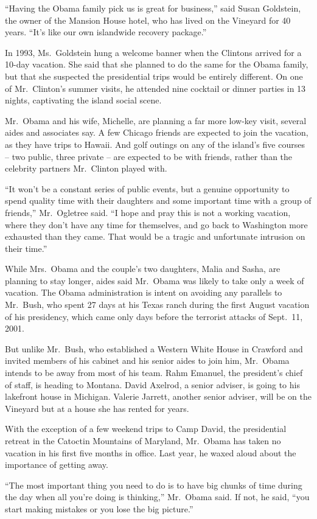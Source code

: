 ﻿\documentclass[12pt]{article}
\begin{document}
``Having the Obama family pick us is great for business,'' said Susan Goldstein, the owner of the
Mansion House hotel, who has lived on the Vineyard for 40 years. ``It's like our own islandwide
recovery package.''

In 1993, Ms.~Goldstein hung a welcome banner when the Clintons arrived for a 10-day vacation. She
said that she planned to do the same for the Obama family, but that she suspected the presidential
trips would be entirely different. On one of Mr.~Clinton's summer visits, he attended nine cocktail
or dinner parties in 13 nights, captivating the island social scene.

Mr.~Obama and his wife, Michelle, are planning a far more low-key visit, several aides and
associates say. A few Chicago friends are expected to join the vacation, as they have trips to
Hawaii. And golf outings on any of the island's five courses -- two public, three private -- are
expected to be with friends, rather than the celebrity partners Mr.~Clinton played with.

``It won't be a constant series of public events, but a genuine opportunity to spend quality time
with their daughters and some important time with a group of friends,'' Mr.~Ogletree said. ``I hope
and pray this is not a working vacation, where they don't have any time for themselves, and go back
to Washington more exhausted than they came. That would be a tragic and unfortunate intrusion on
their time.''

While Mrs.~Obama and the couple's two daughters, Malia and Sasha, are planning to stay longer, aides
said Mr.~Obama was likely to take only a week of vacation. The Obama administration is intent on
avoiding any parallels to Mr.~Bush, who spent 27 days at his Texas ranch during the first August
vacation of his presidency, which came only days before the terrorist attacks of Sept.~11, 2001.

But unlike Mr.~Bush, who established a Western White House in Crawford and invited members of his
cabinet and his senior aides to join him, Mr.~Obama intends to be away from most of his team. Rahm
Emanuel, the president's chief of staff, is heading to Montana. David Axelrod, a senior adviser, is
going to his lakefront house in Michigan. Valerie Jarrett, another senior adviser, will be on the
Vineyard but at a house she has rented for years.

With the exception of a few weekend trips to Camp David, the presidential retreat in the Catoctin
Mountains of Maryland, Mr.~Obama has taken no vacation in his first five months in office. Last
year, he waxed aloud about the importance of getting away.

``The most important thing you need to do is to have big chunks of time during the day when all
you're doing is thinking,'' Mr.~Obama said. If not, he said, ``you start making mistakes or you lose
the big picture.''
\end{document}
